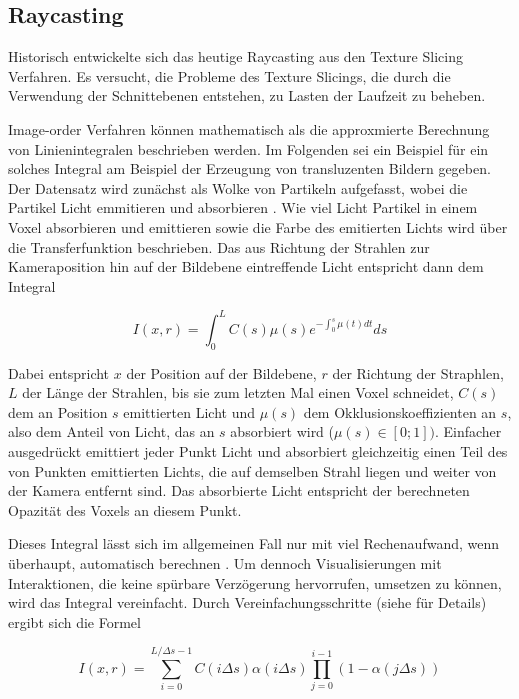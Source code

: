 \documentclass[a4paper,fontsize=12pt,toc=bib,halfparskip]{scrartcl}
\begin{document}
\subsection{Raycasting}
\label{sec:Raycasting}

Historisch entwickelte sich das heutige Raycasting aus den Texture Slicing Verfahren. Es versucht, die Probleme des Texture Slicings, die durch die Verwendung der Schnittebenen entstehen, zu Lasten der Laufzeit zu beheben.

Image-order Verfahren k\"onnen mathematisch als die approxmierte Berechnung von Linienintegralen beschrieben werden. Im Folgenden sei ein Beispiel f\"ur ein solches Integral am Beispiel der Erzeugung von transluzenten Bildern gegeben.
Der Datensatz wird zun\"achst als Wolke von Partikeln aufgefasst, wobei die Partikel Licht emmitieren und absorbieren \cite[s.~134~f.]{hansen2005visualization}. Wie viel Licht Partikel in einem Voxel absorbieren und emittieren sowie die Farbe des emitierten Lichts wird \"uber die Transferfunktion beschrieben. Das aus Richtung der Strahlen zur Kameraposition hin auf der Bildebene eintreffende Licht entspricht dann dem Integral 

\begin{equation}
I(x,r) = \int_{0}^{L} C(s)\mu(s) e^{-\int_{0}^{s}\mu(t)dt}ds
\end{equation}

Dabei entspricht $x$ der Position auf der Bildebene, $r$ der Richtung der Straphlen, $L$ der L\"ange der Strahlen, bis sie zum letzten Mal einen Voxel schneidet, $C(s)$ dem an Position $s$ emittierten Licht und $\mu(s)$ dem Okklusionskoeffizienten an $s$, also dem Anteil von Licht, das an $s$ absorbiert wird ($\mu(s) \in [0;1])$. Einfacher ausgedr\"uckt emittiert jeder Punkt Licht und absorbiert gleichzeitig einen Teil des von Punkten emittierten Lichts, die auf demselben Strahl liegen und weiter von der Kamera entfernt sind. Das absorbierte Licht entspricht der berechneten Opazit\"at des Voxels an diesem Punkt.

Dieses Integral l\"asst sich im allgemeinen Fall nur mit viel Rechenaufwand, wenn \"uberhaupt, automatisch berechnen \cite[S.~136]{hansen2005visualization}. Um dennoch Visualisierungen mit Interaktionen, die keine sp\"urbare Verz\"ogerung hervorrufen, umsetzen zu k\"onnen, wird das Integral vereinfacht. Durch Vereinfachungsschritte (siehe \cite[S.~136]{hansen2005visualization} f\"ur Details) ergibt sich die Formel

\begin{equation}
I(x,r) = \sum_{i=0}^{L/\Delta s - 1} C(i\Delta s)\alpha(i\Delta s) \prod_{j=0}^{i-1}( 1 - \alpha(j \Delta s))
\end{equation}
\end{document}

